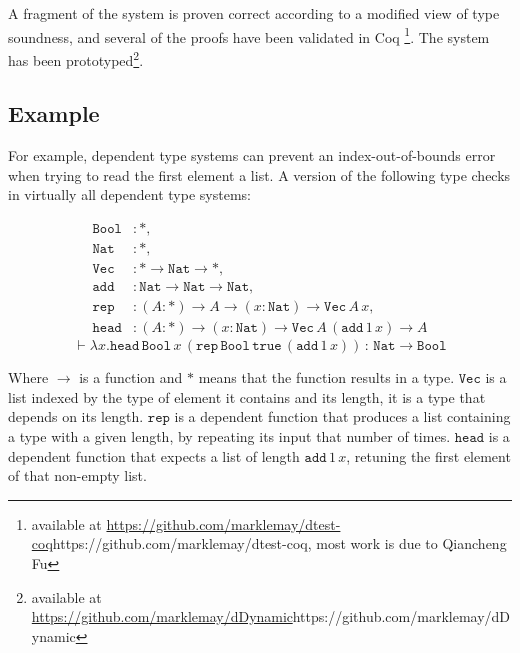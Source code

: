 A fragment of the system is proven correct according to a modified
view of type soundness, and several of the proofs have been validated
in Coq \footnote{available at \url{https://github.com/marklemay/dtest-coq}{https://github.com/marklemay/dtest-coq},
most work is due to Qiancheng Fu}. The system has been prototyped\footnote{available at \url{https://github.com/marklemay/dDynamic}{https://github.com/marklemay/dDynamic}}.


\subsection{Example}

For example, dependent type systems can prevent an index-out-of-bounds
error when trying to read the first element a list. A version of the
following type checks in virtually all dependent type systems:


\begin{align*}
\mathtt{Bool} & :*,\\
\mathtt{Nat} & :*,\\
\mathtt{Vec} & :*\rightarrow\mathtt{Nat}\rightarrow*,\\
\mathtt{add} & :\mathtt{Nat}\rightarrow\mathtt{Nat}\rightarrow\mathtt{Nat},\\
\mathtt{rep} & :\left(A:*\right)\rightarrow A\rightarrow\left(x:\mathtt{Nat}\right)\rightarrow\mathtt{Vec\,}A\,x,\\
\mathtt{head} & :\left(A:*\right)\rightarrow\left(x:\mathtt{Nat}\right)\rightarrow\mathtt{Vec}\,A\,\left(\mathtt{add}\,1\,x\right)\rightarrow A
\end{align*}
\[
\vdash\lambda x.\mathtt{head}\,\mathtt{Bool}\,x\,\left(\mathtt{rep}\,\mathtt{Bool}\,\mathtt{true}\,\left(\mathtt{add}\,1\,x\right)\right)\,:\,\mathtt{Nat}\rightarrow\mathtt{Bool}
\]


Where $\rightarrow$ is a function and $*$ means that the function
results in a type. $\mathtt{Vec}$ is a list indexed by the type of
element it contains and its length, it is a type that depends on its
length. $\mathtt{rep}$ is a dependent function that produces a list
containing a type with a given length, by repeating its input that
number of times. $\mathtt{head}$ is a dependent function that expects
a list of length $\mathtt{add}\,1\,x$, retuning the first element
of that non-empty list. 

